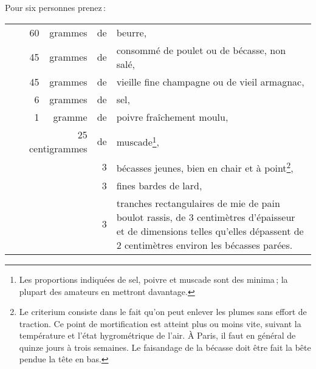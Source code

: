 Pour six personnes prenez :

\footnotesize
\begin{longtable}{rrrrrp{18em}}
 & \hspace{2em} &    60 & grammes & de & beurre,                                                          \\
 & \hspace{2em} &    45 & grammes & de & consommé de poulet ou de bécasse, non salé,                      \\
 & \hspace{2em} &    45 & grammes & de & vieille fine champagne ou de vieil armagnac,                     \\
 & \hspace{2em} &     6 & grammes & de & sel,                                                             \\
 & \hspace{2em} &     1 & gramme  & de & poivre fraîchement moulu,                                        \\
 & \multicolumn{3}{r}{25 centigrammes} & de & muscade\footnote{Les proportions indiquées de sel,
                         poivre et muscade sont des minima ; la plupart des amateurs en mettront
                         davantage.},                                                                     \\
 & \hspace{2em} &       &         &  3 & bécasses jeunes, bien en chair et à point\footnote{Le criterium
                         consiste dans le fait qu'on peut enlever les plumes sans effort de traction. Ce
                         point de mortification est atteint plus ou moins vite, suivant la température
                         et l'état hygrométrique de l'air. À Paris, il faut en général de quinze jours
                         à trois semaines. Le faisandage de la bécasse doit être fait la bête pendue
                         la tête en bas.},                                                                \\
 & \hspace{2em} &       &         &  3 & fines bardes de lard,                                            \\
 & \hspace{2em} &       &         &  3 & tranches rectangulaires de mie de pain boulot rassis,
                                         de 3 centimètres d'épaisseur et de dimensions telles
                                         qu'elles dépassent de 2 centimètres environ les bécasses parées. \\
\end{longtable}
\normalsize

